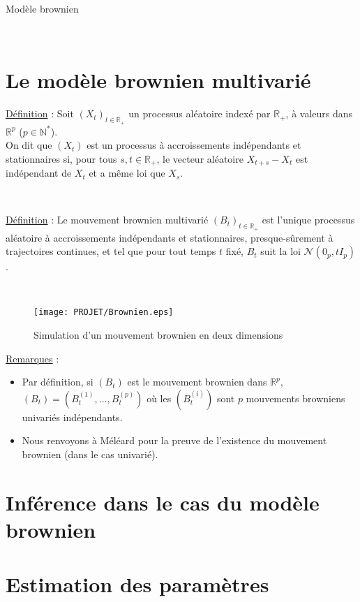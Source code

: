 \documentclass[a4paper,10pt]{article}
\newcommand{\bit}{\begin{itemize}}
\newcommand{\eit}{\end{itemize}}
\newcommand{\R}{\mathbb{R}}
\newcommand{\N}{\mathbb{N}}
\begin{document}
\begin{center}

\Large Modèle brownien

\end{center}

\

\section{Le modèle brownien multivarié}

\underline{Définition} : 
Soit $(X_t)_{t\in\R_+}$ un processus aléatoire indexé par $\R_+$, à valeurs dans $\R^p$ ($p\in\N^*$).\\ On dit que $(X_t)$ est un processus à accroissements indépendants et stationnaires si, pour tous $s,t\in\R_+$, le vecteur aléatoire $X_{t+s}-X_t$ est indépendant de $X_t$ et a même loi que $X_s$.  

\

\underline{Définition} : 
Le mouvement brownien multivarié $(B_t)_{t\in\R_+}$ est l'unique processus aléatoire à accroissements indépendants et stationnaires, presque-sûrement à trajectoires continues, et tel que pour tout temps $t$ fixé, $B_t$ suit la loi $\mathcal N(0_p, tI_p)$.  

\

\begin{figure}[!h]
\centering
\texttt{[image: PROJET/Brownien.eps]}
\caption{Simulation d'un mouvement brownien en deux dimensions}
\end{figure}



\underline{Remarques} :
\bit
\item Par définition, si $(B_t)$ est le mouvement brownien dans $\R^p$, $(B_t)=(B_t^{(1)},\ldots,B_t^{(p)})$ où les $(B_t^{(i)})$ sont $p$ mouvements browniens univariés indépendants.
\item Nous renvoyons à {\red Méléard} pour la preuve de l'existence du mouvement brownien (dans le cas univarié).
\eit

\section{Inférence dans le cas du modèle brownien}

\section{Estimation des paramètres}
\end{document}

